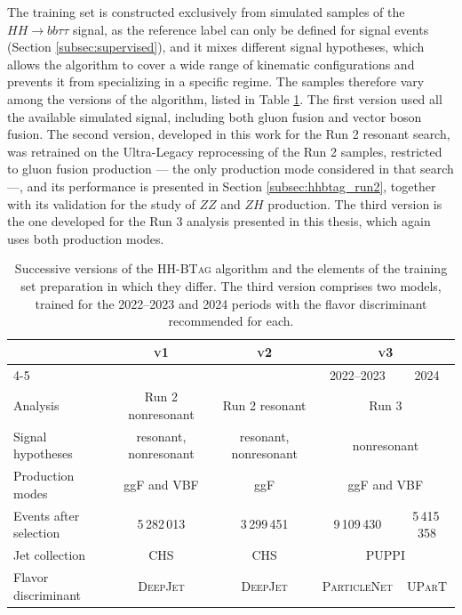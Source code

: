 The training set is constructed exclusively from simulated samples of the $HH\to bb\tau\tau$ signal, as the reference label can only be defined for signal events (Section \ref{subsec:supervised}), and it mixes different signal hypotheses, which allows the algorithm to cover a wide range of kinematic configurations and prevents it from specializing in a specific regime. The samples therefore vary among the versions of the algorithm, listed in Table \ref{tab:hhbtag_versions}. The first version used all the available simulated signal, including both gluon fusion and vector boson fusion. The second version, developed in this work for the Run 2 resonant search, was retrained on the Ultra-Legacy reprocessing of the Run 2 samples, restricted to gluon fusion production — the only production mode considered in that search \cite{CMS-PAS-B2G-24-011} —, and its performance is presented in Section \ref{subsec:hhbtag_run2}, together with its validation for the study of $ZZ$ and $ZH$ production. The third version is the one developed for the Run 3 analysis presented in this thesis, which again uses both production modes.
% 
\begin{table}[t]
\centering
\small
\begin{tabular}{lcccc}
\toprule
                          & \textsc{v1}            & \textsc{v2}            & \multicolumn{2}{c}{\textsc{v3}} \\
\cmidrule(lr){4-5}
                          &                        &                        & 2022--2023             & 2024 \\
\midrule
Analysis                  & Run 2 nonresonant      & Run 2 resonant         & \multicolumn{2}{c}{Run 3} \\
Signal hypotheses         & resonant, nonresonant  & resonant, nonresonant  & \multicolumn{2}{c}{nonresonant} \\
Production modes          & ggF and VBF            & ggF                    & \multicolumn{2}{c}{ggF and VBF} \\
Events after selection    & 5\,282\,013            & 3\,299\,451            & 9\,109\,430   & 5\,415\,358 \\
Jet collection            & CHS                    & CHS                    & \multicolumn{2}{c}{PUPPI} \\
Flavor discriminant      & \textsc{DeepJet}       & \textsc{DeepJet}       & \textsc{ParticleNet}   & \textsc{UParT} \\
\bottomrule
\end{tabular}
\caption{Successive versions of the \textsc{HH-BTag} algorithm and the elements of the training set preparation in which they differ. The third version comprises two models, trained for the 2022--2023 and 2024 periods with the flavor discriminant recommended for each.}
\label{tab:hhbtag_versions}
\end{table}

